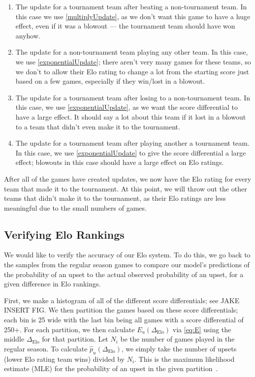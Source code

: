 \documentclass{article}
\begin{document}
\begin{enumerate}
    \item The update for a tournament team after beating a non-tournament team. In this case we use \autoref{multiplyUpdate}, as we don't want this game to have a huge effect, even if it was a blowout --- the tournament team should have won anyhow.
    \item The update for a non-tournament team playing any other team. In this case, we use \autoref{exponentialUpdate}; there aren't very many games for these teams, so we don't to allow their Elo rating to change a lot from the starting score just based on a few games, especially if they win/lost in a blowout.
    \item The update for a tournament team after losing to a non-tournament team. In this case, we use \autoref{exponentialUpdate}, as we want the score differential to have a large effect. It should say a lot about this team if it lost in a blowout to a team that didn't even make it to the tournament.
    \item The update for a tournament team after playing another a tournament team. In this case, we use \autoref{exponentialUpdate} to give the score differential a large effect; blowouts in this case should have a large effect on Elo ratings. 
\end{enumerate}

After all of the games have created updates, we now have the Elo rating for every team that made it to the tournament. At this point, we will throw out the other teams that didn't make it to the tournament, as their Elo ratings are less meaningful due to the small numbers of games.

\subsection{Verifying Elo Rankings}\label{verify}
We would like to verify the accuracy of our Elo system. To do this, we go back to the samples from the regular season games to compare our model's predictions of the probability of an upset to the actual observed probability of an upset, for a given difference in Elo rankings. 

First, we make a histogram of all of the different score differentials; see JAKE INSERT FIG. We then partition the games based on these score differentials; each bin is 25 wide with the last bin being all games with a score differential of 250+. For each partition, we then calculate $E_u(\Delta_{\text{Elo}})$ via \autoref{eq:E} using the middle $\Delta_{\text{Elo}}$ for that partition. Let $N_i$ be the number of games played in the regular season. To calculate $\hat{p}_u(\Delta_{\text{Elo}})$, we simply take the number of upsets (lower Elo rating team wins) divided by $N_i$. This is the maximum likelihood estimate (MLE) for the probability of an upset in the given partition~\cite{statproofbookMaximumLikelihood}.
\end{document}

